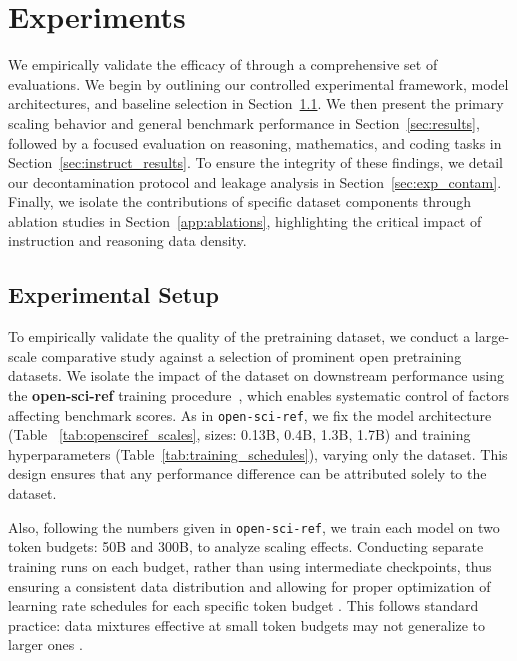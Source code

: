 \section{Experiments}
\label{sec:experiment_results}

We empirically validate the efficacy of \MixtureVitae{} through a comprehensive set of evaluations. 
We begin by outlining our controlled experimental framework, model architectures, and baseline selection in Section~\ref{sec:setup}. 
We then present the primary scaling behavior and general benchmark performance in Section~\ref{sec:results}, followed by a focused evaluation on reasoning, mathematics, and coding tasks in Section~\ref{sec:instruct_results}. 
To ensure the integrity of these findings, we detail our decontamination protocol and leakage analysis in Section~\ref{sec:exp_contam}. 
Finally, we isolate the contributions of specific dataset components through ablation studies in Section~\ref{app:ablations}, highlighting the critical impact of instruction and reasoning data density.


\subsection{Experimental Setup}
\label{sec:setup}
To empirically validate the quality of the \MixtureVitae{} pretraining dataset, we conduct a large-scale comparative study against a selection of prominent open pretraining datasets. We isolate the impact of the dataset on downstream performance using the \textbf{open-sci-ref} training procedure~\citep{nezhurina2025opensciref001openreproduciblereference}, which enables systematic control of factors affecting benchmark scores. As in \texttt{open-sci-ref}, we fix the model architecture (Table ~\ref{tab:opensciref_scales}, sizes: 0.13B, 0.4B, 1.3B, 1.7B) and training hyperparameters (Table~\ref{tab:training_schedules}), varying only the dataset. This design ensures that any performance difference can be attributed solely to the dataset. 

Also, following the numbers given in \texttt{open-sci-ref}, we train each model on two token budgets: 50B and 300B, to analyze scaling effects. Conducting separate training runs on each budget, rather than using intermediate checkpoints, thus ensuring a consistent data distribution and allowing for proper optimization of learning rate schedules for each specific token budget \citep{hoffmann2022}. This follows standard practice: data mixtures effective at small token budgets may not generalize to larger ones \citep{albalak2023efficientonlinedatamixing}. 

